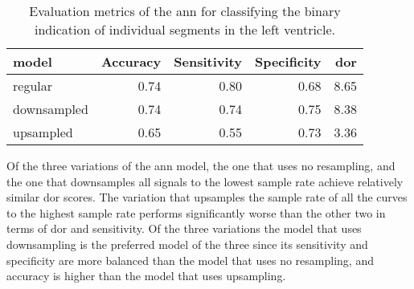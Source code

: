 \begin{table*}[htb]
    \centering
    \begin{tabular}{lrrrr}
        \toprule
        model      &  Accuracy &  Sensitivity &  Specificity &  \acrshort{dor} \\
        \midrule
        regular     &      0.74 &         0.80 &         0.68 & 8.65 \\
        downsampled &      0.74 &         0.74 &         0.75 & 8.38 \\
        upsampled   &      0.65 &         0.55 &         0.73 & 3.36 \\
        \bottomrule
    \end{tabular}
    \caption{Evaluation metrics of the \acrshort{ann} for classifying the binary indication of individual segments in the left ventricle.}
    \label{tab:ANN_segm_ind_perf}
\end{table*}

Of the three variations of the \acrshort{ann} model, the one that uses no resampling, and the one that downsamples all signals to the lowest sample rate achieve relatively similar \acrshort{dor} scores. 
The variation that upsamples the sample rate of all the curves to the highest sample rate performs significantly worse than the other two in terms of \acrshort{dor} and sensitivity. 
Of the three variations the model that uses downsampling is the preferred model of the three since its sensitivity and specificity are more balanced than the model that uses no resampling,
and accuracy is higher than the model that uses upsampling.

\begin{comment}
[ ] \textbf{Comment on spread of \acrshort{dor}.}
    * Of the three variations of the \acrshort{ann} model, the one that uses no resampling, and the one that downsamples all signals to the lowest sample rate achieve relatively similar \acrshort{dor} scores. 
    * The variation that upsamples the sample rate of all the curves to the highest sample rate performs significantly worse than the other two in terms of \acrshort{dor} and sensitivity. 
[ ] \textbf{Comment on spread of sensitivity and specificity.}
[ ] \textbf{Comment on common traits in the high performing models.} Here you can refer to raw performance results in appendix.
[ ] \textbf{Comment on common traits in the low performing models.} Here you can refer to raw performance results in appendix.
[ ] \textbf{Select one - three models that are good contendors for being the best model/model in the group and comment on their traits}
    * Of the three variations the model that uses downsampling is the preferred model of the three since its sensitivity and specificity are more balanced than the model that uses no resampling,
      and accuracy is higher than the model that uses upsampling.
\textbf{IF NOT CLUSTERING model}
[ ] \textbf{Make arguments for and against the top three models in terms of accuracy, sensitivity, specificity, and \acrshort{dor}, and make an informed choice.}
\end{comment}

